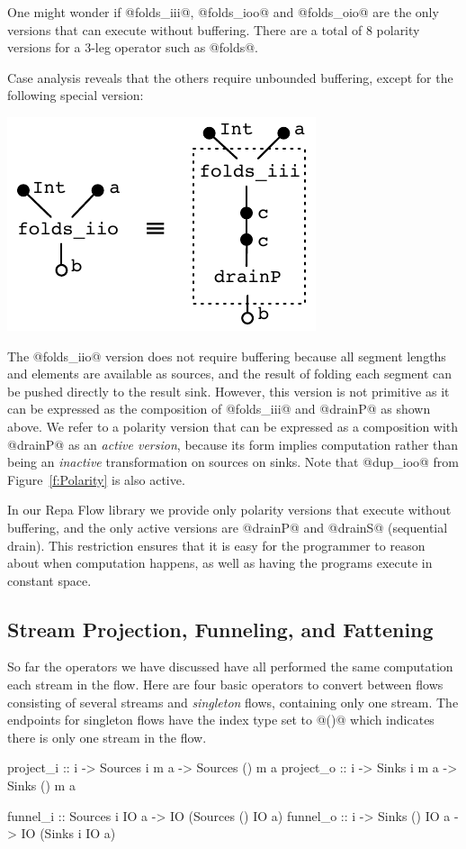 One might wonder if @folds_iii@, @folds_ioo@ and @folds_oio@ are the only versions that can execute without buffering. There are a total of 8 polarity versions for a 3-leg operator such as @folds@.

\eject
Case analysis reveals that the others require unbounded buffering, except for the following special version:
\begin{center}
\includegraphics[scale=0.8]{figures/folds-drain.pdf}
\end{center}

The @folds_iio@ version does not require buffering because all segment lengths and elements are available as sources, and the result of folding each segment can be pushed directly to the result sink. However, this version is not primitive as it can be expressed as the composition of @folds_iii@ and @drainP@ as shown above. We refer to a polarity version that can be expressed as a composition with @drainP@ as an \emph{active version}, because its form implies computation rather than being an \emph{inactive} transformation on sources on sinks. Note that @dup_ioo@ from Figure~\ref{f:Polarity} is also active.

In our Repa Flow library we provide only polarity versions that execute without buffering, and the only active versions are @drainP@ and @drainS@ (sequential drain). This restriction ensures that it is easy for the programmer to reason about when computation happens, as well as having the programs execute in constant space.


\subsection{Stream Projection, Funneling, and Fattening}
So far the operators we have discussed have all performed the same computation each stream in the flow. Here are four basic operators to convert between flows consisting of several streams and \emph{singleton} flows, containing only one stream. The endpoints for singleton flows have the index type set to @()@ which indicates there is only one stream in the flow.
\begin{code}
project_i :: i -> Sources i m a -> Sources () m a
project_o :: i -> Sinks   i m a -> Sinks   () m a

funnel_i :: Sources i IO a ->  IO (Sources () IO a)
funnel_o :: i -> Sinks () IO a -> IO (Sinks i IO a)
\end{code}

